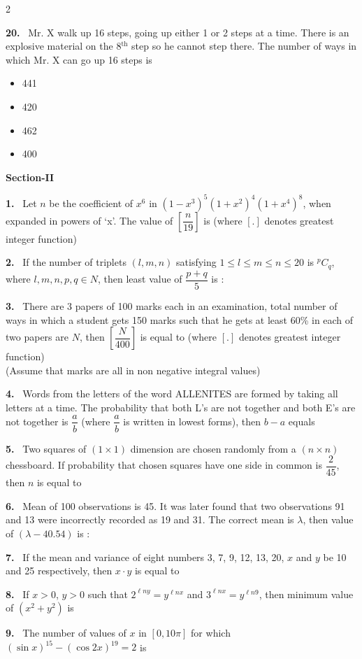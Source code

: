 \documentclass[10pt]{extarticle}
\newcommand{\sect}[1]{\par\smallskip\noindent\textbf{#1}\par}
\newcommand{\qn}[1]{\par\smallskip\noindent\textbf{#1.}~}
\newenvironment{qoptions}{\begin{itemize}[leftmargin=1.8em,itemsep=1pt,topsep=2pt,label={}]}{\end{itemize}}
\newcommand{\opt}[2]{\item[(#1)] #2}
\begin{document}
\begin{multicols}{2}
\qn{20} Mr. X walk up 16 steps, going up either 1 or 2 steps at a time. There is an explosive material on the 8$^{\text{th}}$ step so he cannot step there. The number of ways in which Mr. X can go up 16 steps is
\begin{qoptions}
\opt{A}{441}
\opt{B}{420}
\opt{C}{462}
\opt{D}{400}
\end{qoptions}

\sect{Section-II}

\qn{1} Let $n$ be the coefficient of $x^6$ in $(1-x^3)^5(1+x^2)^4(1+x^4)^8$, when expanded in powers of `x'. The value of $\left[\dfrac n{19}\right]$ is (where $[.]$ denotes greatest integer function)

\qn{2} If the number of triplets $(l,m,n)$ satisfying $1\le l\le m\le n\le20$ is ${}^pC_q$, where $l,m,n,p,q\in N$, then least value of $\dfrac{p+q}{5}$ is :

\qn{3} There are 3 papers of 100 marks each in an examination, total number of ways in which a student gets 150 marks such that he gets at least 60\% in each of two papers are $N$, then $\left[\dfrac N{400}\right]$ is equal to (where $[.]$ denotes greatest integer function)\\
(Assume that marks are all in non negative integral values)

\qn{4} Words from the letters of the word ALLENITES are formed by taking all letters at a time. The probability that both L's are not together and both E's are not together is $\dfrac ab$ (where $\dfrac ab$ is written in lowest forms), then $b-a$ equals

\qn{5} Two squares of $(1\times1)$ dimension are chosen randomly from a $(n\times n)$ chessboard. If probability that chosen squares have one side in common is $\dfrac2{45}$, then $n$ is equal to

\qn{6} Mean of 100 observations is 45. It was later found that two observations 91 and 13 were incorrectly recorded as 19 and 31. The correct mean is $\lambda$, then value of $(\lambda-40.54)$ is :

\qn{7} If the mean and variance of eight numbers 3, 7, 9, 12, 13, 20, $x$ and $y$ be 10 and 25 respectively, then $x\cdot y$ is equal to\underline{\hspace{2.5em}}

\qn{8} If $x>0$, $y>0$ such that $2^{\ell ny}=y^{\ell nx}$ and $3^{\ell nx}=y^{\ell n9}$, then minimum value of $(x^2+y^2)$ is

\qn{9} The number of values of $x$ in $[0,10\pi]$ for which $(\sin x)^{15}-(\cos2x)^{19}=2$ is


\end{multicols}
\end{document}
